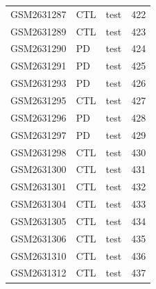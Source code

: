 \begin{footnotesize}
\begin{longtable}{llll}
GSM2631287 & CTL & test & 422 \\
GSM2631289 & CTL & test & 423 \\
GSM2631290 & PD & test & 424 \\
GSM2631291 & PD & test & 425 \\
GSM2631293 & PD & test & 426 \\
GSM2631295 & CTL & test & 427 \\
GSM2631296 & PD & test & 428 \\
GSM2631297 & PD & test & 429 \\
GSM2631298 & CTL & test & 430 \\
GSM2631300 & CTL & test & 431 \\
GSM2631301 & CTL & test & 432 \\
GSM2631304 & CTL & test & 433 \\
GSM2631305 & CTL & test & 434 \\
GSM2631306 & CTL & test & 435 \\
GSM2631310 & CTL & test & 436 \\
GSM2631312 & CTL & test & 437 \\
\end{longtable}\end{footnotesize}
